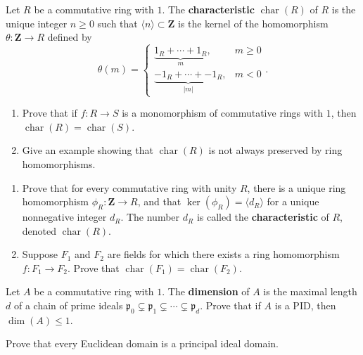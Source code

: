 \documentclass[11pt,twoside,openany]{memoir}
\begin{document}
    \begin{exercise}
    Let $R$ be a commutative ring with $1$. The \textbf{characteristic} $\operatorname{char}(R)$ of $R$ is the unique integer $n\ge 0$ such that $\langle n\rangle \subset \mathbf{Z}$ is the kernel of the homomorphism $\theta:\mathbf{Z}\to R$ defined by
    \[
    \theta(m)=\begin{cases} \underbrace{1_R+\cdots +1_R}_{m}, & m\ge 0\\
    \underbrace{-1_R+\cdots + -1_R}_{|m|}, & m<0 \end{cases}.
    \]
    \begin{enumerate}[label=(\alph*)]
        \item Prove that if $f:R\to S$ is a monomorphism of commutative rings with $1$, then $\operatorname{char}(R)=\operatorname{char}(S)$.
        \item Give an example showing that $\operatorname{char}(R)$ is not always preserved by ring homomorphisms.
    \end{enumerate}
    \end{exercise}
    
    \begin{exercise}
    \begin{enumerate}[label=(\alph*)]
        \item Prove that for every commutative ring with unity $R$, there is a unique ring homomorphism $\phi_R:\mathbf{Z}\to R$, and that $\ker(\phi_R)=\langle d_R\rangle$ for a unique nonnegative integer $d_R$. The number $d_R$ is called the \textbf{characteristic} of $R$, denoted $\operatorname{char}(R)$.
        \item Suppose $F_1$ and $F_2$ are fields for which there exists a ring homomorphism $f:F_1\to F_2$. Prove that $\operatorname{char}(F_1)=\operatorname{char}(F_2)$.
    \end{enumerate}
    \end{exercise}
    
    \begin{exercise}
    Let $A$ be a commutative ring with $1$. The \textbf{dimension} of $A$ is the maximal length $d$ of a chain of prime ideals $\mathfrak{p}_0\subsetneq \mathfrak{p}_1\subsetneq \cdots \subsetneq \mathfrak{p}_d$. Prove that if $A$ is a PID, then $\dim(A)\le 1$.
    \end{exercise}
    
    \begin{exercise}
    Prove that every Euclidean domain is a principal ideal domain.
    \end{exercise}
    
\end{document}
